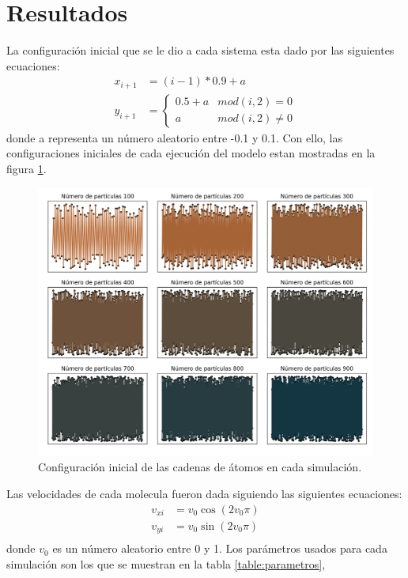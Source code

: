 \section{Resultados}
La configuración inicial que se le dio a cada sistema esta dado por las siguientes ecuaciones:
\begin{align*}
    x_{i+1}&=(i-1)*0.9+a\\
    y_{i+1}&=\left\lbrace\begin{matrix}
        0.5+a & mod(i,2)=0 \\
        a & mod(i,2)\neq 0
    \end{matrix} \right.
\end{align*}
donde a representa un número aleatorio entre -0.1 y 0.1. Con ello, las configuraciones iniciales de cada ejecución del modelo estan
mostradas en la figura \ref{fig:posini}.
\begin{figure}[H]
    \centering
    \includegraphics[scale=0.27]{../Graphics/pos_ini.png}
    \caption{Configuración inicial de las cadenas de átomos en cada simulación.}
    \label{fig:posini}
\end{figure}
Las velocidades de cada molecula fueron dada siguiendo las siguientes ecuaciones:
\begin{align*}
    v_{xi}&=v_{0}\cos(2v_0\pi)\\
    v_{yi}&=v_{0}\sin(2v_0\pi)\\
\end{align*}
donde $v_0$ es un número aleatorio entre 0 y 1. Los parámetros usados para cada simulación son los que se muestran en la tabla \ref{table:parametros},
